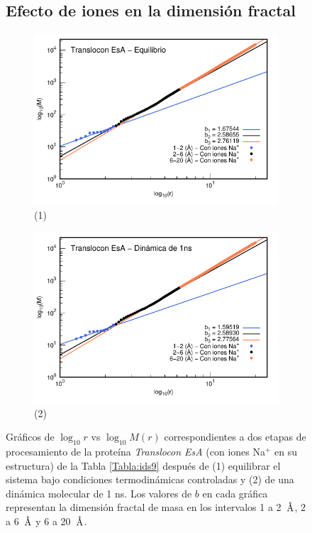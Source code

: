 	\begin{figure}[H]
		\subsection*{Efecto de iones en la dimensi\'{o}n fractal}	
		\centering
		\begin{subfigure}{0.49\textwidth}
			\centering
			\includegraphics[width=\linewidth,page=1]{graphs/PDBs/7khw/ions/7khwEq-wions.pdf}
			\caption{(1)}
		\end{subfigure}
		\hfill
		\begin{subfigure}{0.49\textwidth}
			\centering
			\includegraphics[width=\linewidth,page=1]{graphs/PDBs/7khw/ions/7khw1ns-wions.pdf}
			\caption{(2)}
		\end{subfigure}
		\caption{Gr\'{a}ficos de $\log_{10}r$ vs $\log_{10}M(r)$ correspondientes a dos etapas de procesamiento de la prote\'{i}na \textit{Translocon EsA} (con iones Na$^{+}$ en su estructura) de la Tabla \ref{Tabla:ids9} despu\'{e}s de (1) equilibrar el sistema bajo condiciones termodin\'{a}micas controladas y (2) de una din\'{a}mica molecular de 1 ns. Los valores de $b$ en cada gr\'{a}fica representan la dimensi\'{o}n fractal de masa en los intervalos 1 a 2~$\textup{\r{A}}$, 2 a 6~$\textup{\r{A}}$ y 6 a 20~$\textup{\r{A}}$.}
		\label{fig:7khw-wions}
	\end{figure}
	
